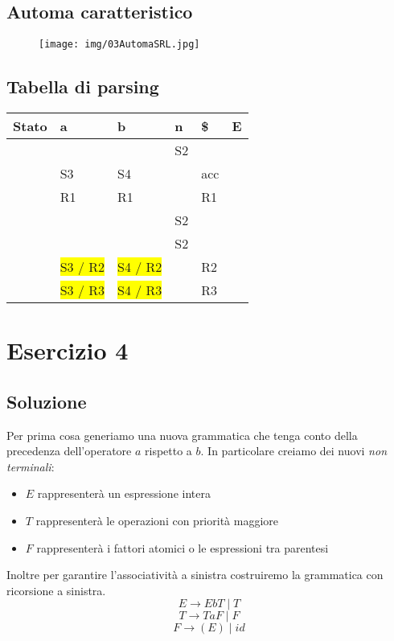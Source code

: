 \documentclass[11pt]{article}
\begin{document}
\subsection{Automa caratteristico}
\begin{figure}[H]
  \centering
  \texttt{[image: img/03AutomaSRL.jpg]}
  \label{fig:03-automa}
\end{figure}
\subsection {Tabella di parsing}

\begin{table}[H]
  \centering
  \begin{tabularx}{\textwidth}{|>{\centering\arraybackslash}X|>{\centering\arraybackslash}X|>{\centering\arraybackslash}X|>{\centering\arraybackslash}X|>{\centering\arraybackslash}X|>{\centering\arraybackslash}X|}
  \hline
  \textbf{Stato} & \textbf{a} & \textbf{b} & \textbf{n} & \textbf{\$} & \textbf{E} \\
  \hline
  0 & & & S2 & & 1 \\
  \hline
  1 & S3 & S4 & & acc & \\
  \hline
  2 & R1 & R1 &  & R1 & \\
  \hline
  3 & & & S2 & & 5\\
  \hline
  4 & & & S2 & & 6\\
  \hline
  5 & \colorbox{yellow}{S3 / R2} & \colorbox{yellow}{S4 / R2} &  & R2 &  \\
  \hline
  6 & \colorbox{yellow}{S3 / R3} & \colorbox{yellow}{S4 / R3} & & R3 &  \\
  \hline
  \end{tabularx}
  \label{tab:03-parsing-table}
\end{table}
\newpage
\section{Esercizio 4}
\subsection*{Soluzione}
Per prima cosa generiamo una nuova grammatica che tenga conto della precedenza 
dell'operatore $a$ rispetto a $b$. In particolare creiamo dei nuovi \textit{non terminali}:
\begin{itemize}
  \item $E$ rappresenterà un espressione intera
  \item $T$ rappresenterà le operazioni con priorità maggiore
  \item $F$ rappresenterà i fattori atomici o le espressioni tra parentesi 
\end{itemize}
Inoltre per garantire l'associatività a sinistra costruiremo la grammatica con ricorsione
a sinistra.
$$E \rightarrow EbT\;|\;T$$
$$T \rightarrow TaF\;|\;F$$
$$F \rightarrow (E)\;|\;id$$
\end{document}
